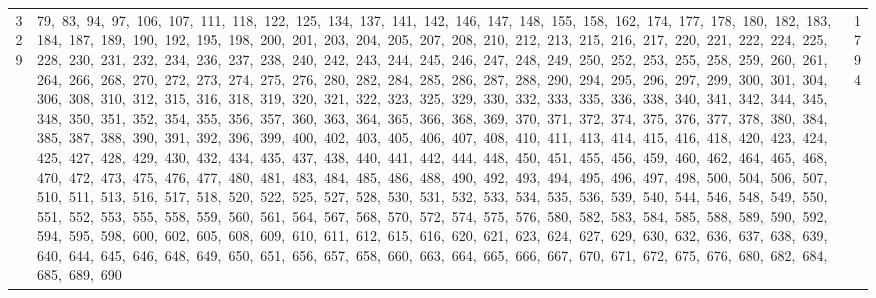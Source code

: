 \begin{longtable}{c|p{}|r}
329 & 79,\ 83,\ 94,\ 97,\ 106,\ 107,\ 111,\ 118,\ 122,\ 125,\ 134,\ 137,\ 141,\ 142,\ 146,\ 147,\ 148,\ 155,\ 158,\ 162,\ 174,\ 177,\ 178,\ 180,\ 182,\ 183,\ 184,\ 187,\ 189,\ 190,\ 192,\ 195,\ 198,\ 200,\ 201,\ 203,\ 204,\ 205,\ 207,\ 208,\ 210,\ 212,\ 213,\ 215,\ 216,\ 217,\ 220,\ 221,\ 222,\ 224,\ 225,\ 228,\ 230,\ 231,\ 232,\ 234,\ 236,\ 237,\ 238,\ 240,\ 242,\ 243,\ 244,\ 245,\ 246,\ 247,\ 248,\ 249,\ 250,\ 252,\ 253,\ 255,\ 258,\ 259,\ 260,\ 261,\ 264,\ 266,\ 268,\ 270,\ 272,\ 273,\ 274,\ 275,\ 276,\ 280,\ 282,\ 284,\ 285,\ 286,\ 287,\ 288,\ 290,\ 294,\ 295,\ 296,\ 297,\ 299,\ 300,\ 301,\ 304,\ 306,\ 308,\ 310,\ 312,\ 315,\ 316,\ 318,\ 319,\ 320,\ 321,\ 322,\ 323,\ 325,\ 329,\ 330,\ 332,\ 333,\ 335,\ 336,\ 338,\ 340,\ 341,\ 342,\ 344,\ 345,\ 348,\ 350,\ 351,\ 352,\ 354,\ 355,\ 356,\ 357,\ 360,\ 363,\ 364,\ 365,\ 366,\ 368,\ 369,\ 370,\ 371,\ 372,\ 374,\ 375,\ 376,\ 377,\ 378,\ 380,\ 384,\ 385,\ 387,\ 388,\ 390,\ 391,\ 392,\ 396,\ 399,\ 400,\ 402,\ 403,\ 405,\ 406,\ 407,\ 408,\ 410,\ 411,\ 413,\ 414,\ 415,\ 416,\ 418,\ 420,\ 423,\ 424,\ 425,\ 427,\ 428,\ 429,\ 430,\ 432,\ 434,\ 435,\ 437,\ 438,\ 440,\ 441,\ 442,\ 444,\ 448,\ 450,\ 451,\ 455,\ 456,\ 459,\ 460,\ 462,\ 464,\ 465,\ 468,\ 470,\ 472,\ 473,\ 475,\ 476,\ 477,\ 480,\ 481,\ 483,\ 484,\ 485,\ 486,\ 488,\ 490,\ 492,\ 493,\ 494,\ 495,\ 496,\ 497,\ 498,\ 500,\ 504,\ 506,\ 507,\ 510,\ 511,\ 513,\ 516,\ 517,\ 518,\ 520,\ 522,\ 525,\ 527,\ 528,\ 530,\ 531,\ 532,\ 533,\ 534,\ 535,\ 536,\ 539,\ 540,\ 544,\ 546,\ 548,\ 549,\ 550,\ 551,\ 552,\ 553,\ 555,\ 558,\ 559,\ 560,\ 561,\ 564,\ 567,\ 568,\ 570,\ 572,\ 574,\ 575,\ 576,\ 580,\ 582,\ 583,\ 584,\ 585,\ 588,\ 589,\ 590,\ 592,\ 594,\ 595,\ 598,\ 600,\ 602,\ 605,\ 608,\ 609,\ 610,\ 611,\ 612,\ 615,\ 616,\ 620,\ 621,\ 623,\ 624,\ 627,\ 629,\ 630,\ 632,\ 636,\ 637,\ 638,\ 639,\ 640,\ 644,\ 645,\ 646,\ 648,\ 649,\ 650,\ 651,\ 656,\ 657,\ 658,\ 660,\ 663,\ 664,\ 665,\ 666,\ 667,\ 670,\ 671,\ 672,\ 675,\ 676,\ 680,\ 682,\ 684,\ 685,\ 689,\ 690 & 1794 \\

\end{longtable}

